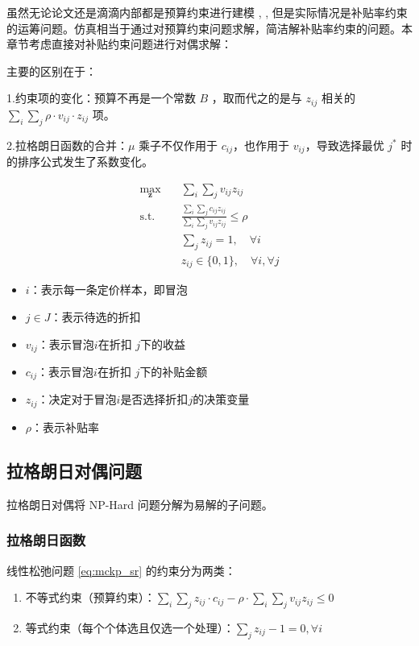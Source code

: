 虽然无论论文还是滴滴内部都是预算约束进行建模
\cite{chen2023two}, \cite{zhang2021bcorle},\cite{zhou2024decision}
但是实际情况是补贴率约束的运筹问题。仿真相当于通过对预算约束问题求解，简洁解补贴率约束的问题。本章节考虑直接对补贴约束问题进行对偶求解：

主要的区别在于：

1.约束项的变化：预算不再是一个常数 $B$ ，取而代之的是与 $z_{ij}$ 相关的 $\sum_i\sum_j\rho \cdot v_{ij}\cdot z_{ij}$ 项。

2.拉格朗日函数的合并：$\mu$ 乘子不仅作用于 $c_{ij}$，也作用于 $v_{ij}$，导致选择最优 $j^*$ 时的排序公式发生了系数变化。

\begin{equation} \label{eq:mckp_sr}
\begin{aligned}
\max_{\bm{z}} \quad & \sum_{i} \sum_{j} v_{ij} z_{ij} \\
\text{s.t.} \quad & \frac{\sum_{i}\sum_{j} c_{ij} z_{ij}}{\sum_{i}\sum_{j} v_{ij} z_{ij}} \le \rho  \\
& \sum_{j} z_{ij} = 1, \quad \forall i \\
& z_{ij} \in \{0, 1\}, \quad\forall i,\forall j
\end{aligned}
\end{equation}
\begin{itemize}
    \item $i$：表示每一条定价样本，即冒泡
    \item $j \in J$：表示待选的折扣
    \item $v_{ij}$：表示冒泡$i$在折扣 $j$下的收益
    \item $c_{ij}$：表示冒泡$i$在折扣 $j$下的补贴金额
    \item $z_{ij}$：决定对于冒泡$i$是否选择折扣$j$的决策变量
    \item $\rho$：表示补贴率
\end{itemize}

\subsection{拉格朗日对偶问题}

拉格朗日对偶将 NP-Hard 问题分解为易解的子问题。

\subsubsection{拉格朗日函数}

线性松弛问题 \eqref{eq:mckp_sr} 的约束分为两类：
\begin{enumerate}
    \item 不等式约束（预算约束）：$\sum_{i}\sum_{j} z_{ij} \cdot c_{ij} - \rho \cdot \sum_{i}\sum_{j} v_{ij} z_{ij} \leq 0$
    \item 等式约束（每个个体选且仅选一个处理）：$\sum_{j} z_{ij} - 1 = 0, \forall i$
\end{enumerate}


